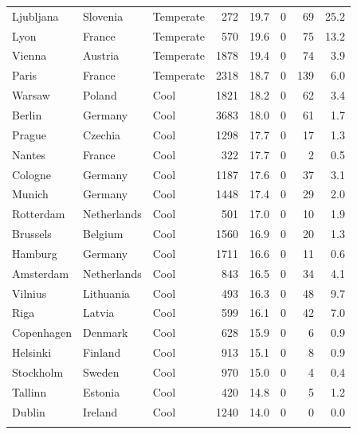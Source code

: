 \begin{longtable}{lllrrrrr}
  Ljubljana & Slovenia & Temperate & 272 & 19.7 & 0 & 69 & 25.2 \\ 
  Lyon & France & Temperate & 570 & 19.6 & 0 & 75 & 13.2 \\ 
  Vienna & Austria & Temperate & 1878 & 19.4 & 0 & 74 & 3.9 \\ 
  Paris & France & Temperate & 2318 & 18.7 & 0 & 139 & 6.0 \\ 
  Warsaw & Poland & Cool & 1821 & 18.2 & 0 & 62 & 3.4 \\ 
  Berlin & Germany & Cool & 3683 & 18.0 & 0 & 61 & 1.7 \\ 
  Prague & Czechia & Cool & 1298 & 17.7 & 0 & 17 & 1.3 \\ 
  Nantes & France & Cool & 322 & 17.7 & 0 & 2 & 0.5 \\ 
  Cologne & Germany & Cool & 1187 & 17.6 & 0 & 37 & 3.1 \\ 
  Munich & Germany & Cool & 1448 & 17.4 & 0 & 29 & 2.0 \\ 
  Rotterdam & Netherlands & Cool & 501 & 17.0 & 0 & 10 & 1.9 \\ 
  Brussels & Belgium & Cool & 1560 & 16.9 & 0 & 20 & 1.3 \\ 
  Hamburg & Germany & Cool & 1711 & 16.6 & 0 & 11 & 0.6 \\ 
  Amsterdam & Netherlands & Cool & 843 & 16.5 & 0 & 34 & 4.1 \\ 
  Vilnius & Lithuania & Cool & 493 & 16.3 & 0 & 48 & 9.7 \\ 
  Riga & Latvia & Cool & 599 & 16.1 & 0 & 42 & 7.0 \\ 
  Copenhagen & Denmark & Cool & 628 & 15.9 & 0 & 6 & 0.9 \\ 
  Helsinki & Finland & Cool & 913 & 15.1 & 0 & 8 & 0.9 \\ 
  Stockholm & Sweden & Cool & 970 & 15.0 & 0 & 4 & 0.4 \\ 
  Tallinn & Estonia & Cool & 420 & 14.8 & 0 & 5 & 1.2 \\ 
  Dublin & Ireland & Cool & 1240 & 14.0 & 0 & 0 & 0.0 \\ 
   \bottomrule
\label{tab:risk_by_city}
\end{longtable}
\endgroup
